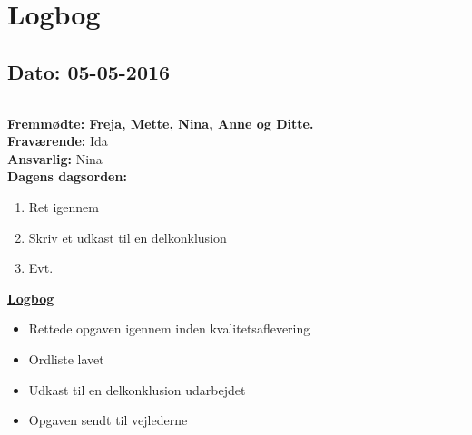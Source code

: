 \chapter{Logbog}
\section{Dato: 05-05-2016}
\hrule
\textbf{Fremmødte: Freja, Mette, Nina, Anne og Ditte.} \\
\textbf{Fraværende: } Ida \\
\textbf{Ansvarlig: } Nina \\
\textbf{Dagens dagsorden: }
\begin{enumerate}
\item Ret igennem
\item Skriv et udkast til en delkonklusion
\item Evt.
\end{enumerate}
\underline{\textbf{Logbog}}
\begin{itemize}
\item Rettede opgaven igennem inden kvalitetsaflevering
\item Ordliste lavet
\item Udkast til en delkonklusion udarbejdet
\item Opgaven sendt til vejlederne
\end{itemize}
